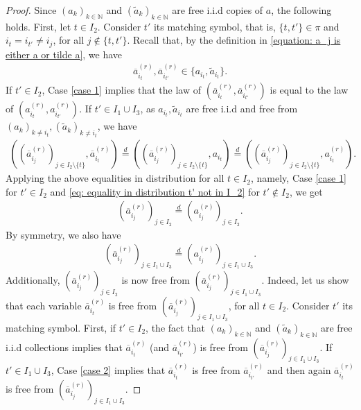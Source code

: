 \documentclass[12pt,reqno]{amsart}
\theoremstyle{plain}
\newcommand{\1}{\mathbf{1}}
\newcommand{\N}{\mathbb{N}}
\begin{document}
\begin{proof}
    Since $(a_k)_{k \in \N}$ and $(\tilde{a}_k)_{k \in \N}$ are free i.i.d copies of $a$, the following holds. First, let $t \in I_2$. Consider $t'$ its matching symbol, that is, $\{t,t'\} \in \pi$ and $i_t=i_{t'} \ne i_j$, for all $j \notin \{t,t'\}$. Recall that, by the definition in \eqref{equation: a_j is either a or tilde a}, we have
    \begin{align*}
        \overline{a}_{i_t}^{(r)},\overline{a}_{i_{t'}}^{(r)} \in \{a_{i_t},\tilde{a}_{i_t}\}.
    \end{align*}
    If $t' \in I_2$, Case \eqref{case 1} implies that the law of $(\overline{a}_{i_t}^{(r)},\overline{a}_{i_{t'}}^{(r)})$ is equal to the law of $({a}_{i_t}^{(r)},{a}_{i_{t'}}^{(r)})$. If $t' \in I_1\cup I_3$, as $a_{i_t},\tilde{a}_{i_t}$ are free i.i.d and free from $(a_k)_{k \ne i_t},(\tilde{a}_k)_{k \ne i_t}$, we have
    \begin{align}\label{eq: equality in distribution t' not in I_2}
        \left((\overline{a}_{i_j}^{(r)})_{j \in I_2\setminus\{t\}},\overline{a}_{i_t}^{(r)}\right)\overset{d}{=}\left((\overline{a}^{(r)}_{i_j})_{j \in I_2\setminus\{t\}},a_{i_t}\right)\overset{d}{=}\left((\overline{a}^{(r)}_{i_j})_{j \in I_2\setminus\{t\}},a_{i_t}^{(r)}\right).
    \end{align}
    Applying the above equalities in distribution for all $t \in I_2$, namely, Case \eqref{case 1} for $t' \in I_2$ and \eqref{eq: equality in distribution t' not in I_2} for $t' \notin I_2$, we get
    \begin{align*}
        \left(\overline{a}_{i_j}^{(r)}\right)_{j \in I_2}\overset{d}{=}\left(a_{i_j}^{(r)}\right)_{j \in I_2}.
    \end{align*}
    By symmetry, we also have
    \begin{align*}
        \left(\overline{a}_{i_j}^{(r)}\right)_{j \in I_1\cup I_3}\overset{d}{=}\left(a_{i_j}^{(r)}\right)_{j \in I_1\cup I_3}.
    \end{align*}
    Additionally, $\left(\overline{a}_{i_j}^{(r)}\right)_{j \in I_2}$ is now free from $\left(\overline{a}_{i_j}^{(r)}\right)_{j \in I_1\cup I_3}$. Indeed, let us show that each variable $\overline{a}_{i_t}^{(r)}$ is free from $\left(\overline{a}_{i_j}^{(r)}\right)_{j \in I_1\cup I_3}$, for all $t \in I_2$. Consider $t'$ its matching symbol. First, if $t' \in I_2$, the fact that $(a_k)_{k \in \N}$ and $(\tilde{a}_k)_{k \in \N}$ are free i.i.d collections implies that $\overline{a}_{i_t}^{(r)}$ (and $\overline{a}_{i_{t'}}^{(r)}$) is free from $\left(\overline{a}_{i_j}^{(r)}\right)_{j \in I_1\cup I_3}$. If $t' \in I_1\cup I_3$, Case \eqref{case 2} implies that $\overline{a}_{i_t}^{(r)}$ is free from $\overline{a}_{i_{t'}}^{(r)}$ and then again $\overline{a}_{i_t}^{(r)}$ is free from $\left(\overline{a}_{i_j}^{(r)}\right)_{j \in I_1\cup I_3}$. 
    

\end{proof}
\end{document}
